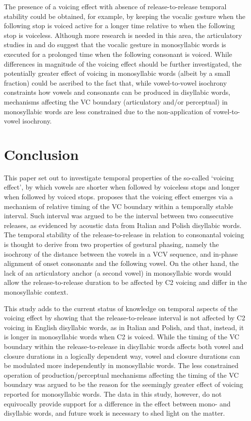 \documentclass[12pt,a4paper,]{article}
\begin{document}
The presence of a voicing effect with absence of release-to-release
temporal stability could be obtained, for example, by keeping the
vocalic gesture when the following stop is voiced active for a longer
time relative to when the following stop is voiceless. Although more
research is needed in this area, the articulatory studies in
\citet{raphael1972} and \citet{de-jong1991} do suggest that the vocalic
gesture in monosyllabic words is executed for a prolonged time when the
following consonant is voiced. While differences in magnitude of the
voicing effect should be further investigated, the potentially greater
effect of voicing in monosyllabic words (albeit by a small fraction)
could be ascribed to the fact that, while vowel-to-vowel isochrony
constraints how vowels and consonants can be produced in disyllabic
words, mechanisms affecting the VC boundary (articulatory and/or
perceptual) in monosyllabic words are less constrained due to the
non-application of vowel-to-vowel isochrony.

\hypertarget{conclusion}{%
\section{Conclusion}\label{conclusion}}

This paper set out to investigate temporal properties of the so-called
`voicing effect', by which vowels are shorter when followed by voiceless
stops and longer when followed by voiced stops. \citet{coretta2019k}
proposes that the voicing effect emerges via a mechanism of relative
timing of the VC boundary within a temporally stable interval. Such
interval was argued to be the interval between two consecutive releases,
as evidenced by acoustic data from Italian and Polish disyllabic words.
The temporal stability of the release-to-release in relation to
consonantal voicing is thought to derive from two properties of gestural
phasing, namely the isochrony of the distance between the vowels in a
VCV sequence, and in-phase alignment of onset consonants and the
following vowel. On the other hand, the lack of an articulatory anchor
(a second vowel) in monosyllabic words would allow the
release-to-release duration to be affected by C2 voicing and differ in
the monosyllabic context.

This study adds to the current status of knowledge on temporal aspects
of the voicing effect by showing that the release-to-release interval is
not affected by C2 voicing in English disyllabic words, as in Italian
and Polish, and that, instead, it is longer in monosyllabic words when
C2 is voiced. While the timing of the VC boundary within the
release-to-release in disyllabic words affects both vowel and closure
durations in a logically dependent way, vowel and closure durations can
be modulated more independently in monosyllabic words. The less
constrained operation of production/perceptual mechanisms affecting the
timing of the VC boundary was argued to be the reason for the seemingly
greater effect of voicing reported for monosyllabic words. The data in
this study, however, do not equivocally provide support for a difference
in the effect between mono- and disyllabic words, and future work is
necessary to shed light on the matter.
\end{document}
